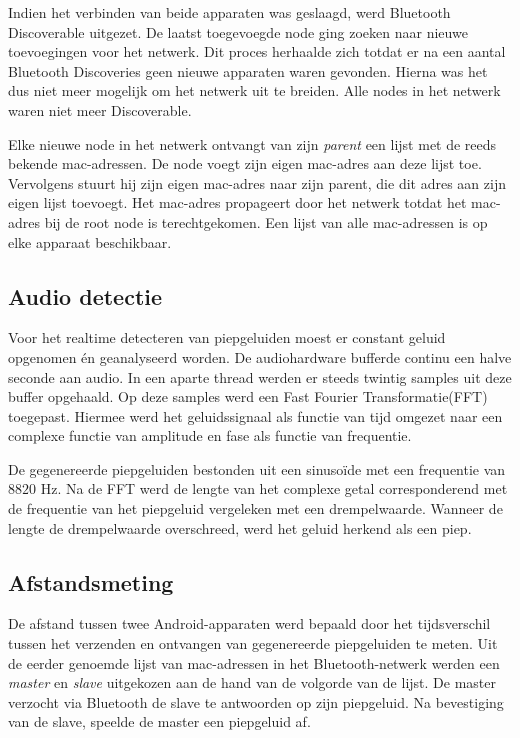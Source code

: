 \documentclass[12pt]{article}
\begin{document}
Indien het verbinden van beide apparaten was geslaagd, werd Bluetooth Discoverable uitgezet. De laatst toegevoegde node ging zoeken naar nieuwe toevoegingen voor het netwerk. Dit proces herhaalde zich totdat er na een aantal Bluetooth Discoveries geen nieuwe apparaten waren gevonden. Hierna was het dus niet meer mogelijk om het netwerk uit te breiden. Alle nodes in het netwerk waren niet meer Discoverable.

Elke nieuwe node in het netwerk ontvangt van zijn \textit{parent} een lijst met de reeds bekende mac-adressen. De node voegt zijn eigen mac-adres aan deze lijst toe. Vervolgens stuurt hij zijn eigen mac-adres naar zijn parent, die dit adres aan zijn eigen lijst toevoegt. Het mac-adres propageert door het netwerk totdat het mac-adres bij de root node is terechtgekomen. Een lijst van alle mac-adressen is op elke apparaat beschikbaar. 

\subsection{Audio detectie}
Voor het realtime detecteren van piepgeluiden moest er constant geluid opgenomen \'en geanalyseerd worden. De audiohardware bufferde continu een halve seconde aan audio. In een aparte thread werden er steeds twintig samples uit deze buffer opgehaald. Op deze samples werd een Fast Fourier Transformatie(FFT) \cite{bracewell1986fourier} toegepast. Hiermee werd het geluidssignaal als functie van tijd omgezet naar een complexe functie van amplitude en fase als functie van frequentie. 

De gegenereerde piepgeluiden bestonden uit een sinuso\"ide met een frequentie van $8820$ Hz. Na de FFT werd de lengte van het complexe getal corresponderend met de frequentie van het piepgeluid vergeleken met een drempelwaarde. Wanneer de lengte de drempelwaarde overschreed, werd het geluid herkend als een piep.

\subsection{Afstandsmeting}
De afstand tussen twee Android-apparaten werd bepaald door het tijdsverschil tussen het verzenden en ontvangen van gegenereerde piepgeluiden te meten. Uit de eerder genoemde lijst van mac-adressen in het Bluetooth-netwerk werden een \textit{master} en \textit{slave} uitgekozen aan de hand van de volgorde van de lijst. De master verzocht via Bluetooth de slave te antwoorden op zijn piepgeluid. Na bevestiging van de slave, speelde de master een piepgeluid af.
\end{document}
